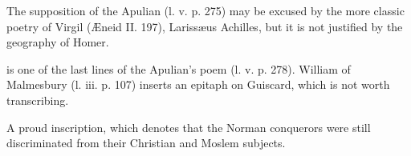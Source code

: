 The supposition of the Apulian (l. v. p. 275) may be excused by the more classic poetry of Virgil (Æneid II. 197), Larissæus Achilles, but it is not justified by the geography of Homer.

is one of the last lines of the Apulian\texthebrew{}’s poem (l. v. p. 278). William of Malmesbury (l. iii. p. 107) inserts an epitaph on Guiscard, which is not worth transcribing.

A proud inscription, which denotes that the Norman conquerors were still discriminated from their Christian and Moslem subjects.

